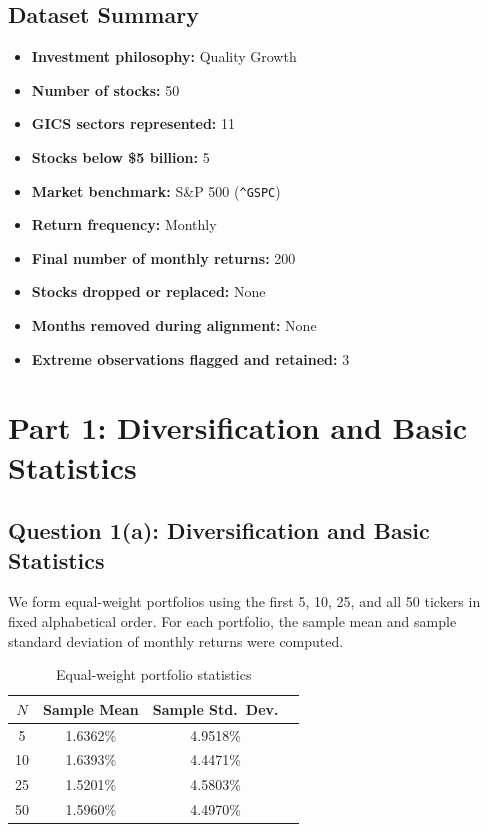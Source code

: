 \documentclass[11pt]{article}
\begin{document}
\subsection{Dataset Summary}

\begin{itemize}
    \item \textbf{Investment philosophy:} Quality Growth
    \item \textbf{Number of stocks:} 50
    \item \textbf{GICS sectors represented:} 11
    \item \textbf{Stocks below \$5 billion:} 5
    \item \textbf{Market benchmark:} S\&P 500 (\texttt{\^{}GSPC})
    \item \textbf{Return frequency:} Monthly
    \item \textbf{Final number of monthly returns:} 200
    \item \textbf{Stocks dropped or replaced:} None
    \item \textbf{Months removed during alignment:} None
    \item \textbf{Extreme observations flagged and retained:} 3
\end{itemize}

\section{Part 1: Diversification and Basic Statistics}

\subsection{Question 1(a): Diversification and Basic Statistics}

We form equal-weight portfolios using the first 5, 10, 25, and all 50
tickers in fixed alphabetical order. For each portfolio, the sample mean and
sample standard deviation of monthly returns were computed.

\begin{table}[H]
\centering
\caption{Equal-weight portfolio statistics}
\begin{tabular}{cccc}
\toprule
$N$ & Sample Mean & Sample Std.\ Dev. \\
\midrule
5  & 1.6362\% & 4.9518\% \\
10 & 1.6393\% & 4.4471\% \\
25 & 1.5201\% & 4.5803\% \\
50 & 1.5960\% & 4.4970\% \\
\bottomrule
\end{tabular}
\end{table}
\end{document}

